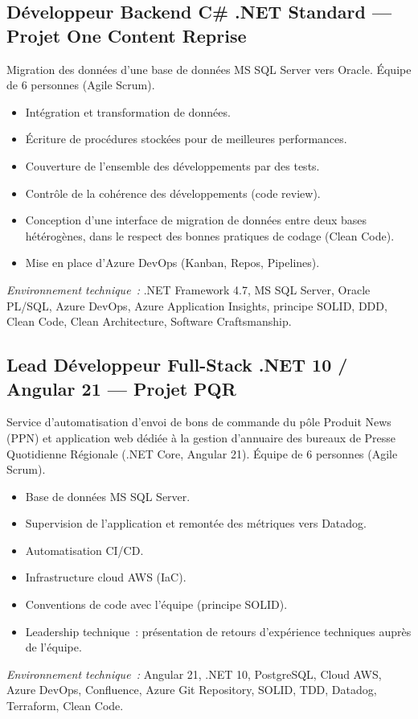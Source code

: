 \documentclass[10pt,a4paper]{article}
\begin{document}
\vspace{6pt}

\subsection*{Développeur Backend C\# .NET Standard --- Projet One Content Reprise}
\color{darkgray}
Migration des données d'une base de données MS SQL Server vers Oracle. Équipe de 6 personnes (Agile Scrum).
\begin{itemize}
  \item Intégration et transformation de données.
  \item Écriture de procédures stockées pour de meilleures performances.
  \item Couverture de l'ensemble des développements par des tests.
  \item Contrôle de la cohérence des développements (code review).
  \item Conception d'une interface de migration de données entre deux bases hétérogènes, dans le respect des bonnes pratiques de codage (Clean Code).
  \item Mise en place d'Azure DevOps (Kanban, Repos, Pipelines).
\end{itemize}
\textit{Environnement technique~:} .NET Framework 4.7, MS SQL Server, Oracle PL/SQL, Azure DevOps, Azure Application Insights, principe SOLID, DDD, Clean Code, Clean Architecture, Software Craftsmanship.

\vspace{6pt}

\subsection*{Lead Développeur Full-Stack .NET 10 / Angular 21 --- Projet PQR}
\color{darkgray}
Service d'automatisation d'envoi de bons de commande du pôle Produit News (PPN) et application web dédiée à la gestion d'annuaire des bureaux de Presse Quotidienne Régionale (.NET Core, Angular 21). Équipe de 6 personnes (Agile Scrum).
\begin{itemize}
  \item Base de données MS SQL Server.
  \item Supervision de l'application et remontée des métriques vers Datadog.
  \item Automatisation CI/CD.
  \item Infrastructure cloud AWS (IaC).
  \item Conventions de code avec l'équipe (principe SOLID).
  \item Leadership technique~: présentation de retours d'expérience techniques auprès de l'équipe.
\end{itemize}
\textit{Environnement technique~:} Angular 21, .NET 10, PostgreSQL, Cloud AWS, Azure DevOps, Confluence, Azure Git Repository, SOLID, TDD, Datadog, Terraform, Clean Code.
\end{document}
